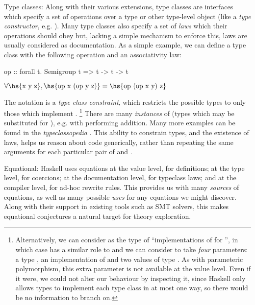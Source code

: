 \begin{description}
\item{Type classes}: Along with their various extensions, type classes are
  interfaces which specify a set of operations over a type or other type-level
  object (like a \emph{type constructor}, e.g. ). Many type classes
  also specify a set of \emph{laws} which their operations should obey but,
  lacking a simple mechanism to enforce this, laws are usually considered as
  documentation. As a simple example, we can define a type class 
  with the following operation and an associativity law:

  \begin{center}
    \begin{haskell}
op :: forall t. Semigroup t => t -> t -> t
    \end{haskell}

    $\forall \text{\hs{x y z}}, \text{\hs{op x (op y z)}} =
                                \text{\hs{op (op x y) z}}$
  \end{center}

  The notation  is a \emph{type class constraint}, which
  restricts the possible types  to only those which implement
  . \footnote{Alternatively, we can consider  as
    the type of ``implementations of  for '', in which case
  \hs{=>} has a similar role to \hs{->} and we can consider  to take
  \emph{four} parameters: a type , an implementation of 
  and two values of type . As with parameteric polymorphism, this extra
   parameter is not available at the value level. Even if it
  were, we could not alter our behaviour by inspecting it, since Haskell only
  allows types to implement each type class in at most one way, so there would
  be no information to branch on.} There are many \emph{instances} of
   (types which may be substituted for ), e.g. 
  with  performing addition. Many more examples can be found in the
  \emph{typeclassopedia} \cite{yorgey2009typeclassopedia}. This ability to
  constrain types, and the existence of laws, helps us reason about code
  generically, rather than repeating the same arguments for each particular pair
  of  and .

\item{Equational}: Haskell uses equations at the value level, for definitions;
  at the type level, for coercions; at the documentation level, for typeclass
  laws; and at the compiler level, for ad-hoc rewrite rules. This provides us
  with many \emph{sources} of equations, as well as many possible \emph{uses}
  for any equations we might discover. Along with their support in existing
  tools such as SMT solvers, this makes equational conjectures a natural target
  for theory exploration.


\end{description}
